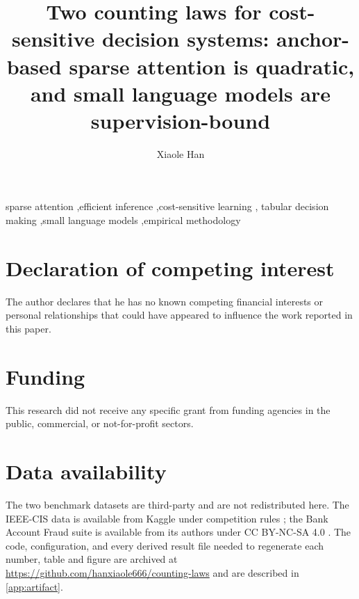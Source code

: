 \documentclass[preprint,12pt,3p]{elsarticle}
\theoremstyle{definition}
\theoremstyle{remark}
\begin{document}
\begin{frontmatter}

\title{Two counting laws for cost-sensitive decision systems: anchor-based
sparse attention is quadratic, and small language models are
supervision-bound}

\author[1]{Xiaole Han}

\begin{abstract}

\end{abstract}

\begin{keyword}
sparse attention \sep efficient inference \sep cost-sensitive learning \sep
tabular decision making \sep small language models \sep empirical methodology
\end{keyword}

\end{frontmatter}












\appendix




\section*{Declaration of competing interest}
The author declares that he has no known competing financial interests or
personal relationships that could have appeared to influence the work
reported in this paper.

\section*{Funding}
This research did not receive any specific grant from funding agencies in the
public, commercial, or not-for-profit sectors.

\section*{Data availability}
The two benchmark datasets are third-party and are not redistributed here.
The IEEE-CIS data is available from Kaggle under competition rules
\cite{ieeecis2019}; the Bank Account Fraud suite is available from its authors
under CC BY-NC-SA 4.0 \cite{jesus2022turning}. The code, configuration, and
every derived result file needed to regenerate each number, table and figure
are archived at \url{https://github.com/hanxiaole666/counting-laws} and are
described in \ref{app:artifact}.
\end{document}
